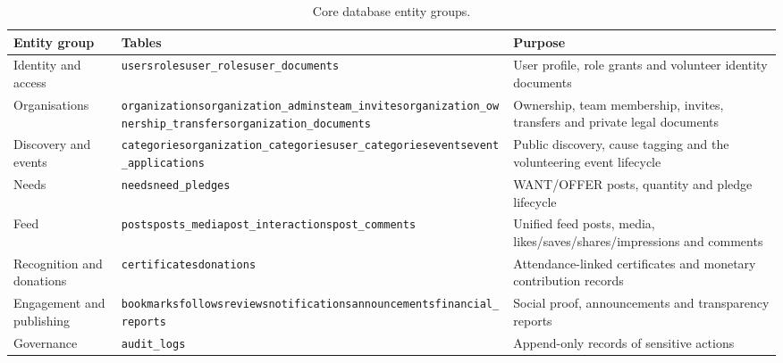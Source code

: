 \begin{table}[H]\centering
\caption{Core database entity groups.}
\label{tab:entities}
\begin{tabularx}{\textwidth}{|>{\raggedright\arraybackslash}p{}|>{\raggedright\arraybackslash}p{}|Y|}
\hline
\textbf{Entity group} & \textbf{Tables} & \textbf{Purpose}\\\hline
Identity and access & \texttt{users}\newline\texttt{roles}\newline\texttt{user\_roles}\newline\texttt{user\_documents} & User profile, role grants and volunteer identity documents\\\hline
Organisations & \texttt{organizations}\newline\texttt{organization\_\allowbreak admins}\newline\texttt{team\_invites}\newline\texttt{organization\_\allowbreak ownership\_\allowbreak transfers}\newline\texttt{organization\_\allowbreak documents} & Ownership, team membership, invites, transfers and private legal documents\\\hline
Discovery and events & \texttt{categories}\newline\texttt{organization\_categories}\newline\texttt{user\_categories}\newline\texttt{events}\newline\texttt{event\_applications} & Public discovery, cause tagging and the volunteering event lifecycle\\\hline
Needs & \texttt{needs}\newline\texttt{need\_pledges} & WANT/OFFER posts, quantity and pledge lifecycle\\\hline
Feed & \texttt{posts}\newline\texttt{posts\_media}\newline\texttt{post\_interactions}\newline\texttt{post\_comments} & Unified feed posts, media, likes/saves/shares/impressions and comments\\\hline
Recognition and donations & \texttt{certificates}\newline\texttt{donations} & Attendance-linked certificates and monetary contribution records\\\hline
Engagement and publishing & \texttt{bookmarks}\newline\texttt{follows}\newline\texttt{reviews}\newline\texttt{notifications}\newline\texttt{announcements}\newline\texttt{financial\_reports} & Social proof, announcements and transparency reports\\\hline
Governance & \texttt{audit\_logs} & Append-only records of sensitive actions\\\hline
\end{tabularx}
\end{table}

